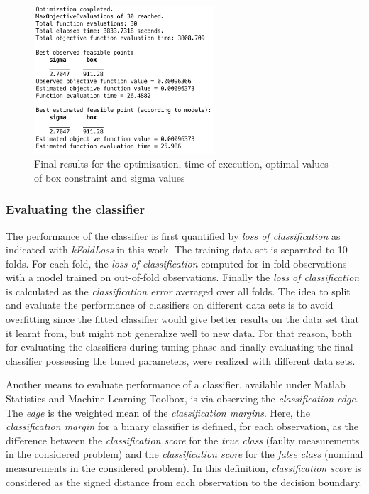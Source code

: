 \begin{figure}
\begin{center}
\includegraphics[width=0.6\textwidth]{figures/optimizationResultsStuckFault}    %
\caption{Final results for the optimization, time of execution, optimal values of box constraint and sigma values} 
\label{fig:optimBayesianResults}
\end{center}
\end{figure}

\subsubsection{Evaluating the classifier}
\label{evalClassifier}

The performance of the classifier is first quantified by \emph{loss of classification} as indicated with \emph{kFoldLoss} in this work. 
The training data set is  separated to 10 folds. For each fold, the \emph{loss of classification} computed for in-fold observations with a model trained on out-of-fold observations. 
Finally the \emph{loss of classification} is calculated as the \emph{classification error} averaged over all folds.
The idea to split and evaluate the performance of classifiers on different data sets is to avoid overfitting since the fitted classifier would give better results on the data set that it learnt from, but might not generalize well to new data. 
For that reason, both for evaluating the classifiers during tuning phase and finally evaluating the final classifier possessing the tuned parameters, were realized with different data sets.

Another means to evaluate performance of a classifier, available under Matlab Statistics and Machine Learning Toolbox, is via observing the \emph{classification edge}. 
The \emph{edge} is the weighted mean of the \emph{classification margins}. 
Here, the \emph{classification margin} for a binary classifier is defined, for each observation, as the difference between the \emph{classification score} for the \emph{true class} (faulty measurements in the considered problem) and the \emph{classification score} for the \emph{false class} (nominal measurements in the considered problem). 
In this definition, \emph{classification score} is considered as the signed distance from each observation to the decision boundary.


